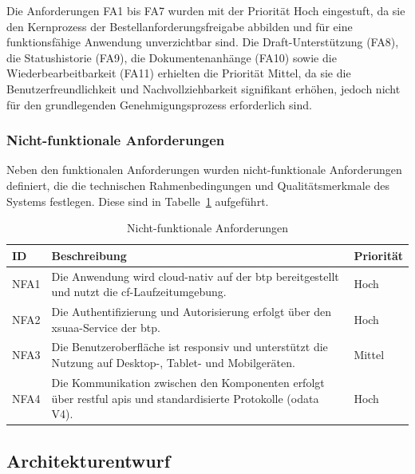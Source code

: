 Die Anforderungen FA1 bis FA7 wurden mit der Priorität \glqq Hoch\grqq{} eingestuft, da sie den Kernprozess der Bestellanforderungsfreigabe abbilden und für eine funktionsfähige Anwendung unverzichtbar sind. Die Draft-Unterstützung (FA8), die Statushistorie (FA9), die Dokumentenanhänge (FA10) sowie die Wiederbearbeitbarkeit (FA11) erhielten die Priorität \glqq Mittel\grqq{}, da sie die Benutzerfreundlichkeit und Nachvollziehbarkeit signifikant erhöhen, jedoch nicht für den grundlegenden Genehmigungsprozess erforderlich sind.

\subsubsection{Nicht-funktionale Anforderungen}
\label{subsubsec:nichtfunktionale-anforderungen}

Neben den funktionalen Anforderungen wurden nicht-funktionale Anforderungen definiert, die die technischen Rahmenbedingungen und Qualitätsmerkmale des Systems festlegen. Diese sind in Tabelle~\ref{tab:nichtfunktionale-anforderungen} aufgeführt.

\begin{table}[H]
  \centering
  \caption{Nicht-funktionale Anforderungen}
  \label{tab:nichtfunktionale-anforderungen}
  \begin{tabularx}{\textwidth}{l X l}
    \hline
    \textbf{ID} & \textbf{Beschreibung} & \textbf{Priorität} \\
    \hline
    NFA1 & Die Anwendung wird cloud-nativ auf der \gls{btp} bereitgestellt und nutzt die \gls{cf}-Laufzeitumgebung. & Hoch \\
    NFA2 & Die Authentifizierung und Autorisierung erfolgt über den \gls{xsuaa}-Service der \gls{btp}. & Hoch \\
    NFA3 & Die Benutzeroberfläche ist responsiv und unterstützt die Nutzung auf Desktop-, Tablet- und Mobilgeräten. & Mittel \\
    NFA4 & Die Kommunikation zwischen den Komponenten erfolgt über \gls{rest}ful \gls{api}s und standardisierte Protokolle (\gls{odata} V4). & Hoch \\
    \hline
  \end{tabularx}
\end{table}

\subsection{Architekturentwurf}
\label{subsec:architekturentwurf}


